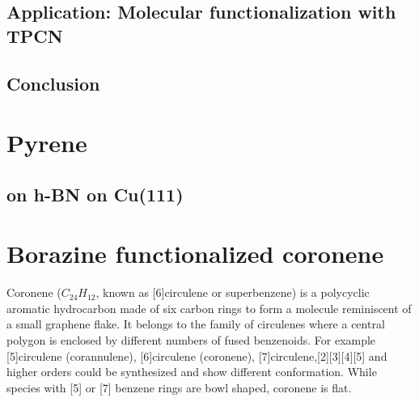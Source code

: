 \documentclass[
10pt,					%
a4paper,				%
twoside,				%
BCOR=8mm,				%
headings=normal,		%
headsepline,			%
footsepline,			%
plainfootsepline,		%
]{scrbook}
\begin{document}
  \section{Application: Molecular functionalization with TPCN}
     
  \section{Conclusion}
     
\chapter{Pyrene}
\section{on h-BN on Cu(111)}

\chapter{Borazine functionalized coronene}
Coronene ($C_{24}H_{12}$, known as [6]circulene or superbenzene) is a polycyclic aromatic hydrocarbon made of six carbon rings to form a molecule reminiscent of a small graphene flake. It belongs to the family of circulenes where a central polygon is enclosed by different numbers of fused benzenoids. For example [5]circulene (corannulene), [6]circulene (coronene), [7]circulene,[2][3][4][5] and higher orders could be synthesized and show different conformation. While species with [5] or [7] benzene rings are bowl shaped, coronene is flat.
\end{document}
